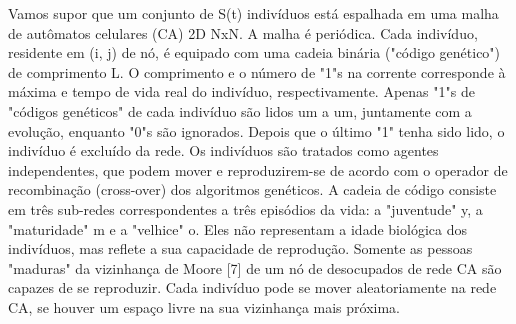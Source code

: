 \documentclass{article}
\begin{document}

Vamos supor que um conjunto de S(t) indivíduos está espalhada em uma malha de autômatos celulares (CA) 2D NxN. A malha é periódica. Cada indivíduo, residente em (i, j) de nó, é equipado com uma cadeia binária ("código genético") de comprimento L. O comprimento e o número de "1"s na corrente corresponde à máxima e tempo de vida real do indivíduo, respectivamente. Apenas "1"s de "códigos genéticos" de cada indivíduo são lidos um a um, juntamente com a evolução, enquanto "0"s são ignorados. Depois que o último "1" tenha sido lido, o indivíduo é excluído da rede. Os indivíduos são tratados como agentes independentes, que podem mover e reproduzirem-se de acordo com o operador de recombinação (cross-over) dos algoritmos genéticos. A cadeia de código consiste em três sub-redes correspondentes a três episódios da vida: a "juventude" y, a "maturidade" m e a "velhice" o. Eles não representam a idade biológica dos indivíduos, mas reflete a sua capacidade de reprodução. Somente as pessoas "maduras" da vizinhança de Moore [7] de um nó de desocupados de rede CA são capazes de se reproduzir. Cada indivíduo pode se mover aleatoriamente na rede CA, se houver um espaço livre na sua vizinhança mais próxima.

\end{document}
